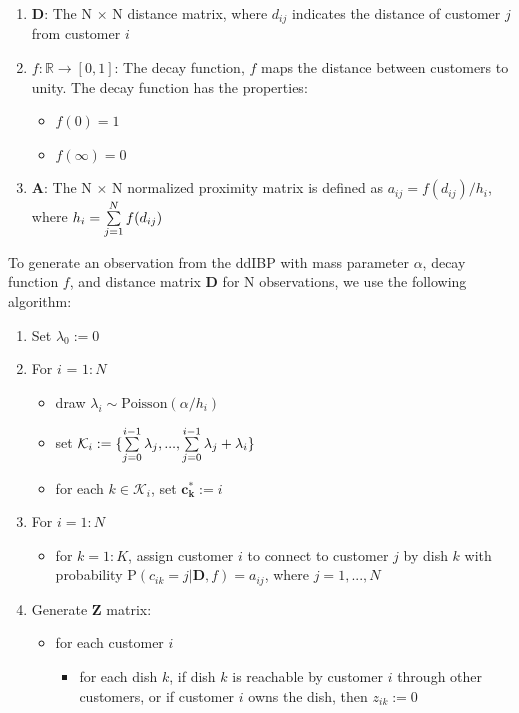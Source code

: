 \begin{enumerate}
  \item $\bm D$: The N $\times$ N distance matrix, where $d_{ij}$ indicates the 
                 distance of customer $j$ from customer $i$
  
  \item $f: \mathbb{R} \rightarrow [0,1]$: The decay function, $f$ maps the 
                                           distance between customers to unity.
                                           The decay function has the properties:
                                           \begin{itemize}
                                             \item $f(0) = 1$
                                             \item $f(\infty) = 0$
                                           \end{itemize}

  \item $\bm A$: The N $\times$ N normalized proximity matrix is defined as
                 $a_{ij} = f(d_{ij}) / h_i$, where $h_i = \sum\limits_{j=1}^{N} f(d_{ij})$
\end{enumerate}

\noindent
To generate an observation from the ddIBP with mass parameter $\alpha$, decay
function $f$, and distance matrix $\bm D$ for N observations, we use the following
algorithm:

\begin{enumerate}
  \item Set $\lambda_0:=0$

  \item For $i$ = $1:N$
    \begin{itemize}
      \item draw $\lambda_i \sim \text{Poisson}(\alpha / h_i) $
      \item set $\mathcal{K}_i:= 
            \{\sum\limits_{j=0}^{i-1} \lambda_j,...,\sum\limits_{j=0}^{i-1} \lambda_j+\lambda_i \}$
      \item for each $k \in \mathcal{K}_i$, set $\bm{c_k^*}:=i$
    \end{itemize}

  \item For $i=1:N$
    \begin{itemize}
      \item for $k = 1:K$, assign customer $i$ to connect to customer $j$ by 
            dish $k$ with probability P$(c_{ik}=j|\bm D,f) = a_{ij}$, where
            $j = 1,...,N$ 
    \end{itemize}

  \item Generate $\bm Z$ matrix: 
    \begin{itemize}
      \item for each customer $i$
      \begin{itemize}
        \item for each dish $k$,
              if dish $k$ is reachable by customer $i$ through other customers,
              or if customer $i$ owns the dish, then $z_{ik}:=0$
      \end{itemize}
    \end{itemize}
\end{enumerate}

